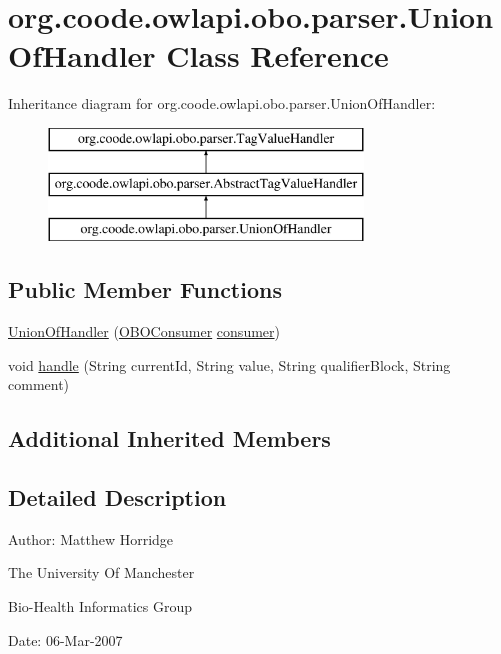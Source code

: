 \hypertarget{classorg_1_1coode_1_1owlapi_1_1obo_1_1parser_1_1_union_of_handler}{\section{org.\-coode.\-owlapi.\-obo.\-parser.\-Union\-Of\-Handler Class Reference}
\label{classorg_1_1coode_1_1owlapi_1_1obo_1_1parser_1_1_union_of_handler}
}
Inheritance diagram for org.\-coode.\-owlapi.\-obo.\-parser.\-Union\-Of\-Handler\-:\begin{figure}[H]
\begin{center}
\leavevmode
\includegraphics[height=3.000000cm]{classorg_1_1coode_1_1owlapi_1_1obo_1_1parser_1_1_union_of_handler}
\end{center}
\end{figure}
\subsection*{Public Member Functions}
\begin{DoxyCompactItemize}
\item 
\hyperlink{classorg_1_1coode_1_1owlapi_1_1obo_1_1parser_1_1_union_of_handler_a0f365397ee481b238f667594595ded4b}{Union\-Of\-Handler} (\hyperlink{classorg_1_1coode_1_1owlapi_1_1obo_1_1parser_1_1_o_b_o_consumer}{O\-B\-O\-Consumer} \hyperlink{classorg_1_1coode_1_1owlapi_1_1obo_1_1parser_1_1_abstract_tag_value_handler_ab27f1ff22d15640c5f81585f18265137}{consumer})
\item 
void \hyperlink{classorg_1_1coode_1_1owlapi_1_1obo_1_1parser_1_1_union_of_handler_a7bc4c35d4059d86abaed2adee06fe5d1}{handle} (String current\-Id, String value, String qualifier\-Block, String comment)
\end{DoxyCompactItemize}
\subsection*{Additional Inherited Members}


\subsection{Detailed Description}
Author\-: Matthew Horridge\par
 The University Of Manchester\par
 Bio-\/\-Health Informatics Group\par
 Date\-: 06-\/\-Mar-\/2007\par
\par
 

